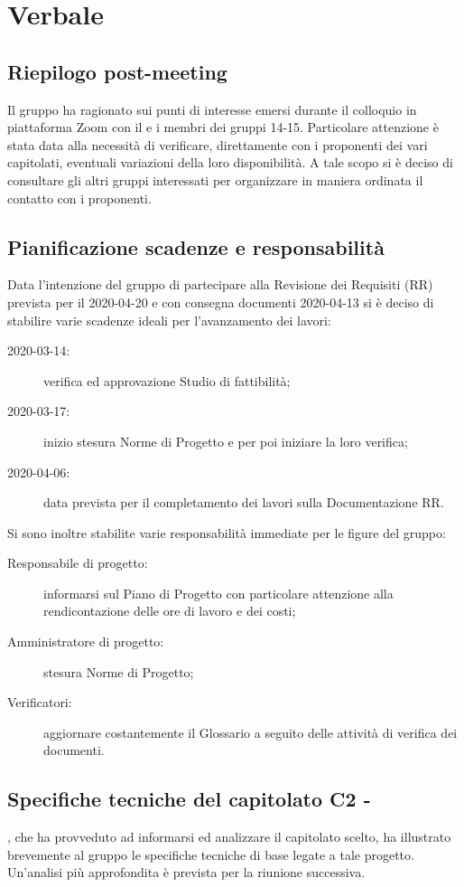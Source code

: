 \section{Verbale}
\subsection{Riepilogo post-meeting}
Il gruppo ha ragionato sui punti di interesse emersi durante il colloquio in piattaforma Zoom con il \TV{} e i membri dei gruppi 14-15. Particolare attenzione è stata data alla necessità di verificare, direttamente con i proponenti dei vari capitolati, eventuali variazioni della loro disponibilità. A tale scopo si è deciso di consultare gli altri gruppi interessati per organizzare in maniera ordinata il contatto con i proponenti.

\subsection{Pianificazione scadenze e responsabilità}
Data l'intenzione del gruppo di partecipare alla Revisione dei Requisiti (RR) prevista per il 2020-04-20 e con consegna documenti 2020-04-13 si è deciso di stabilire varie scadenze ideali per l'avanzamento dei lavori:
\begin{description}
	\item[2020-03-14:] verifica ed approvazione Studio di fattibilità;
	\item[2020-03-17:] inizio stesura Norme di Progetto e per poi iniziare la loro verifica;
	\item[2020-04-06:] data prevista per il completamento dei lavori sulla Documentazione RR.
\end{description}
Si sono inoltre stabilite varie responsabilità immediate per le figure del gruppo:
\begin{description}
	\item[Responsabile di progetto:] informarsi sul Piano di Progetto con particolare attenzione alla rendicontazione delle ore di lavoro e dei costi;
	\item[Amministratore di progetto:] stesura Norme di Progetto;
	\item[Verificatori:] aggiornare costantemente il Glossario a seguito delle attività di verifica dei documenti.
\end{description}

\subsection{Specifiche tecniche del capitolato C2 - \NomeProgetto}
\EG{}, che ha provveduto ad informarsi ed analizzare il capitolato scelto, ha illustrato brevemente al gruppo le specifiche tecniche di base legate a tale progetto. Un'analisi più approfondita è prevista per la riunione successiva.


